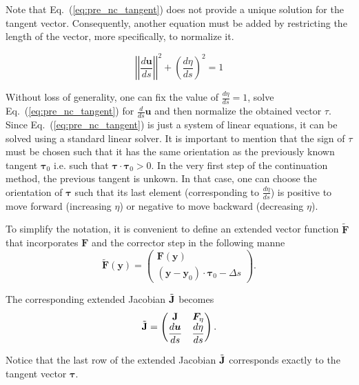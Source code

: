 Note that Eq.~(\ref{eq:pre_nc_tangent}) does not provide a unique solution for
the tangent vector. Consequently, another equation must be added by restricting
the length of the vector, more specifically, to normalize it.

\begin{equation}
    \left|\left|\dfrac{d\bm{u}}{ds}\right|\right|^2 + \left(\dfrac{d\eta}{ds}\right)^2 = 1
    \label{eq:pre_nc_tangent_normalization}
\end{equation}

Without loss of generality, one can fix the value of $\frac{d \eta}{ds} = 1$, solve 
Eq.~(\ref{eq:pre_nc_tangent}) for $\frac{d}{ds}\bm{u}$ and then normalize the obtained
vector $\tau$. Since Eq.~(\ref{eq:pre_nc_tangent}) is just a system of linear equations, 
it can be solved using a standard linear solver. It is important to mention that the
sign of $\tau$ must be chosen such that it has the same orientation as the 
previously known tangent $\bm{\tau}_0$ i.e. such that $\bm{\tau} \cdot \bm{\tau}_0 > 0$. 
In the very first step of the continuation method, the previous tangent is unkown. 
In that case, one can choose the orientation of $\bm{\tau}$ such that its last element 
(corresponding to  $\frac{d \eta}{ds}$) is positive to move forward (increasing $\eta$) or
negative to move backward (decreasing $\eta$).


To simplify the notation, it is convenient to define an extended vector 
function $\tilde{ \bm{F} }$ that incorporates $\bm{F}$ and the corrector 
step in the following manne
\begin{equation}
    \tilde{\bm{F}}(\bm{y}) = 
    \begin{pmatrix}
        \bm{F}(\bm{y}) \\ 
        (\bm{y} - \bm{y}_0) \cdot \bm{\tau}_0 - \Delta s
    \end{pmatrix}.
    \label{eq:pre_nc_palc_system}
\end{equation} 

The corresponding extended Jacobian $\tilde{\mathbf{J}}$ becomes
\begin{equation}
    \tilde{\mathbf{J}} = 
    \begin{pmatrix}
        \mathbf{J} & \bm{F}_\eta \\
        \dfrac{d\bm{u}}{ds} & \dfrac{d\eta}{ds} \\
    \end{pmatrix}.
\end{equation}

Notice that the last row of the extended Jacobian $\tilde{\mathbf{J}}$ corresponds
exactly to the tangent vector $\bm{\tau}$. 


